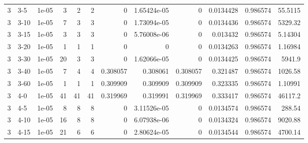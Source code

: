 \begin{tabular}{rlrrrrrrrrrr}
     3 & 3-5    &      1e-05 &           3 &                 2 &                 2 &     0           &     1.65424e-05 &      0           &        0.0134428 &               0.986574 &          55.5115   \\
     3 & 3-10   &      1e-05 &           7 &                 3 &                 3 &     0           &     1.73094e-05 &      0           &        0.0134436 &               0.986574 &        5329.32     \\
     3 & 3-15   &      1e-05 &           3 &                 3 &                 3 &     0           &     5.76008e-06 &      0           &        0.013432  &               0.986574 &           5.14304  \\
     3 & 3-20   &      1e-05 &           1 &                 1 &                 1 &     0           &     0           &      0           &        0.0134263 &               0.986574 &           1.16984  \\
     3 & 3-30   &      1e-05 &          20 &                 3 &                 3 &     0           &     1.62066e-05 &      0           &        0.0134425 &               0.986574 &        5941.9      \\
     3 & 3-40   &      1e-05 &           7 &                 4 &                 4 &     0.308057    &     0.308061    &      0.308057    &        0.321487  &               0.986574 &        1026.58     \\
     3 & 3-60   &      1e-05 &           1 &                 1 &                 1 &     0.309909    &     0.309909    &      0.309909    &        0.323335  &               0.986574 &           1.10991  \\
     3 & 4-0    &      1e-05 &          41 &                41 &                41 &     0.319969    &     0.319991    &      0.319969    &        0.333417  &               0.986574 &       46117.2      \\
     3 & 4-5    &      1e-05 &           8 &                 8 &                 8 &     0           &     3.11526e-05 &      0           &        0.0134574 &               0.986574 &         288.54     \\
     3 & 4-10   &      1e-05 &          16 &                 8 &                 8 &     0           &     6.07938e-06 &      0           &        0.0134324 &               0.986574 &        9020.88     \\
     3 & 4-15   &      1e-05 &          21 &                 6 &                 6 &     0           &     2.80624e-05 &      0           &        0.0134544 &               0.986574 &        4700.14     \\

\end{tabular}
